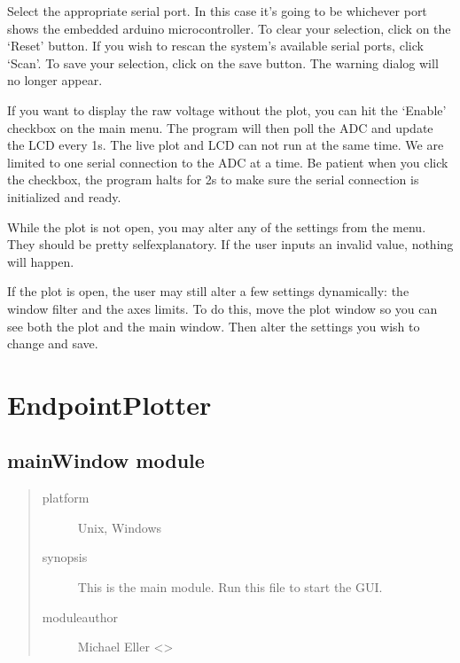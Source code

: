 \documentclass[letterpaper,10pt,english]{sphinxmanual}
\begin{document}
\noindent{}

Select the appropriate serial port. In this case it’s going to be whichever port shows the embedded arduino microcontroller. To clear your selection, click on the ‘Reset’ button. If you wish to rescan the system’s available serial ports, click ‘Scan’. To save your selection, click on the save button. The warning dialog will no longer appear.

If you want to display the raw voltage without the plot, you can hit the ‘Enable’ checkbox on the main menu. The program will then poll the ADC and update the LCD every 1s. The live plot and LCD can not run at the same time. We are limited to one serial connection to the ADC at a time. Be patient when you click the checkbox, the program halts for 2s to make sure the serial connection is initialized and ready.

\noindent{}

While the plot is not open, you may alter any of the settings from the menu. They should be pretty self\sphinxhyphen{}explanatory. If the user inputs an invalid value, nothing will happen.

If the plot is open, the user may still alter a few settings dynamically: the window filter and the axes limits. To do this, move the plot window so you can see both the plot and the main window. Then alter the settings you wish to change and save.

\noindent{}


\chapter{EndpointPlotter}
\label{\detokenize{modules:endpointplotter}}\label{\detokenize{modules::doc}}

\section{mainWindow module}
\label{\detokenize{mainWindow:module-mainWindow}}\label{\detokenize{mainWindow:mainwindow-module}}\label{\detokenize{mainWindow::doc}}\begin{quote}\begin{description}
\item[{platform}] \leavevmode
Unix, Windows

\item[{synopsis}] \leavevmode
This is the main module. Run this file to start the GUI.

\item[{moduleauthor}] \leavevmode
Michael Eller \textless{}\textgreater{}

\end{description}\end{quote}
\end{document}
